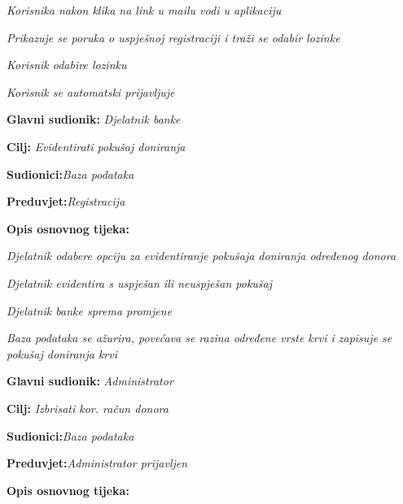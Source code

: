 \documentclass[11pt]{book}
\begin{document}
\begin{packed_item}
\begin{packed_item}
\begin{packed_item}
\begin{packed_item}
	\item[] \begin{packed_enum}
		
		\item \textit{Korisnika nakon klika na link u mailu vodi u aplikaciju}\eject
		\item \textit{Prikazuje se poruka o uspješnoj registraciji i traži se odabir lozinke}\eject 
		\item \textit{Korisnik odabire lozinku}\eject 
		\item \textit{Korisnik se automatski prijavljuje}\eject
		
	\end{packed_enum}
	
\end{packed_item}

\noindent {}
\begin{packed_item}
	
	\item \textbf{Glavni sudionik: }\textit{Djelatnik banke}\eject
	\item  \textbf{Cilj:} \textit{Evidentirati pokušaj doniranja}\eject
	\item  \textbf{Sudionici:}\textit{Baza podataka}\eject 
	\item  \textbf{Preduvjet:}\textit{Registracija}\eject
	\item  \textbf{Opis osnovnog tijeka:}
	
	\item[] \begin{packed_enum}
		
		\item \textit{Djelatnik odabere opciju za evidentiranje pokušaja doniranja određenog donora}\eject
		\item \textit{Djelatnik evidentira s uspješan ili neuspješan pokušaj}\eject 
		\item \textit{Djelatnik banke sprema promjene}\eject 
		\item \textit{Baza podataka se ažurira, povećava se razina određene vrste krvi i zapisuje se pokušaj doniranja krvi}\eject
		
	\end{packed_enum}
	
\end{packed_item}
\noindent {}
\begin{packed_item}
	
	\item \textbf{Glavni sudionik: }\textit{Administrator}\eject
	\item  \textbf{Cilj:} \textit{Izbrisati kor. račun donora}\eject
	\item  \textbf{Sudionici:}\textit{Baza podataka}\eject 
	\item  \textbf{Preduvjet:}\textit{Administrator prijavljen}\eject
	\item  \textbf{Opis osnovnog tijeka:}
	

\end{packed_item}
\end{packed_item}
\end{packed_item}
\end{packed_item}
\end{document}
